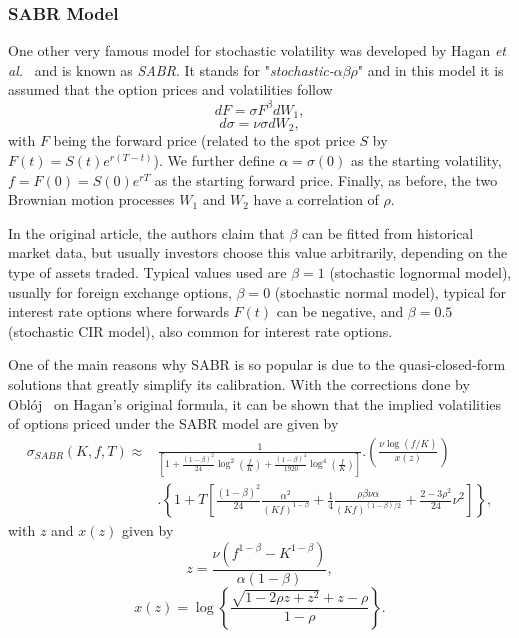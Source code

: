 \subsubsection{SABR Model}
One other very famous model for stochastic volatility was developed by Hagan \textit{et al.}~\cite{Hagan} and is known as \emph{SABR}. It stands for "\emph{stochastic-}$\alpha\beta\rho$" and in this model it is assumed that the option prices and volatilities follow
\begin{equation}\label{dF}
dF=\sigma F^\beta dW_1,
\end{equation}
\begin{equation}\label{dsigma}
d\sigma=\nu\sigma dW_2,
\end{equation}
\noindent with $F$ being the forward price (related to the spot price $S$ by $F(t)=S(t)e^{r(T-t)}$).
We further define $\alpha=\sigma(0)$ as the starting volatility, $f=F(0)=S(0)e^{rT}$ as the starting forward price. Finally, as before, the two Brownian motion processes $W_1$ and $W_2$ have a correlation of $\rho$.

\iffalse
It should be noted that we are now using the \hl{forward measure}, so in eq.\eqref{dF} we use $F$, the \emph{forward price}, instead of the usual spot price $S$ from eq.  \ref{GBM}. These two quantities are related by $S(t)=e^{-r(T-t)}F(t)$, so we can easily obtain one from the other.
\fi


In the original article, the authors claim that $\beta$ can be fitted from historical market data, but usually investors choose this value arbitrarily, depending on the type of assets traded. Typical values used are $\beta=1$ (stochastic lognormal model), usually for foreign exchange options, $\beta=0$ (stochastic normal model), typical for interest rate options where forwards $F(t)$ can be negative, and $\beta=0.5$ (stochastic CIR model), also common for interest rate options.

One of the main reasons why SABR is so popular is due to the quasi-closed-form solutions that greatly simplify its calibration. With the corrections done by Oblój~\cite{Obloj} on Hagan's original formula, it can be shown that the implied volatilities of options priced under the SABR model are given by
\begin{equation}\label{sabr}
\begin{split}
\sigma_{SABR}(K,f,T)\approx&\frac{1}{\displaystyle\left[1+\frac{(1-\beta)^2}{24}\log^2\left(\frac{f}{K}\right)+\frac{(1-\beta)^4}{1920}\log^4\left(\frac{f}{K}\right)\right]}.\left(\frac{\nu\log\left(f/K\right)}{x(z)}\right)\\
&.\left\{1+T\left[\frac{(1-\beta)^2}{24}\frac{\alpha^2}{(Kf)^{1-\beta}}+\frac{1}{4}\frac{\rho\beta\nu\alpha}{(Kf)^{(1-\beta)/2}}+\frac{2-3\rho^2}{24}\nu^2\right]\right\},
\end{split}
\end{equation}
\noindent with $z$ and $x(z)$ given by
\begin{equation}
z=\frac{\nu\left(f^{1-\beta}-K^{1-\beta}\right)}{\alpha(1-\beta)},
\end{equation}
\begin{equation}
x(z)=\log\left\{\frac{\sqrt{1-2\rho z+z^2}+z-\rho}{1-\rho}\right\}.
\end{equation}

